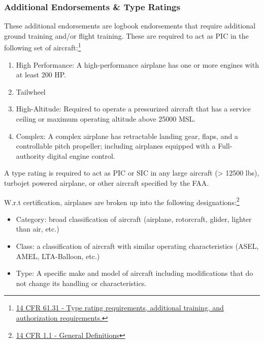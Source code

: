 \documentclass[12pt]{article}
\begin{document}
		\subsubsection{Additional Endorsements \& Type Ratings}
			These additional endorsements are logbook endorsements that require additional ground training and/or flight training. These are required to act as PIC in the following set of aircraft:\footnote{\href{https://www.law.cornell.edu/cfr/text/14/61.31}{14 CFR 61.31 - Type rating requirements, additional training, and authorization requirements.}}
			\begin{enumerate}
				\item High Performance: A high-performance airplane has one or more engines with at least 200 HP.
				\item Tailwheel
				\item High-Altitude: Required to operate a pressurized aircraft that has a service ceiling or maximum operating altitude above 25000 MSL.
				\item Complex: A complex airplane has retractable landing gear, flaps, and a controllable pitch propeller; including airplanes equipped with a Full-authority digital engine control.
			\end{enumerate}

			A type rating is required to act as PIC or SIC in any large aircraft (> 12500 lbs), turbojet powered airplane, or other aircraft specified by the FAA.

			W.r.t certification, airplanes are broken up into the following designations:\footnote{\href{https://www.law.cornell.edu/cfr/text/14/1.1}{14 CFR 1.1 - General Definitions}}

			\begin{itemize}
				\item Category: broad classification of aircraft (airplane, rotorcraft, glider, lighter than air, etc.)
				\item Class: a classification of aircraft with similar operating characteristics (ASEL, AMEL, LTA-Balloon, etc.)
				\item Type: A specific make and model of aircraft including modifications that do not change its handling or characteristics.
			\end{itemize}
\end{document}
